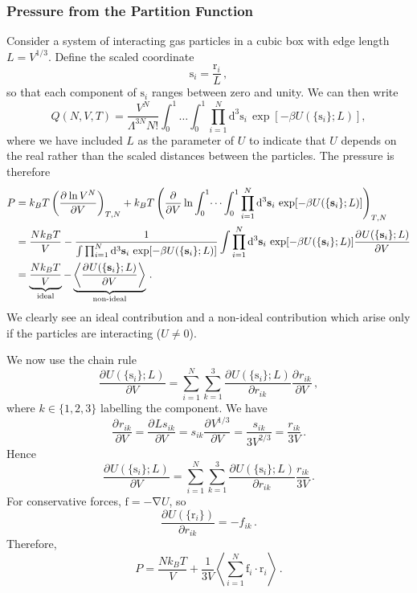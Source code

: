 \documentclass{article}
\theoremstyle{plain}\theoremheaderfont{\normalfont\bfseries}\theorembodyfont{\rmfamily}\theoremseparator{.}\newtheorem*{thm}{Theorem}\newtheorem*{law}{Law}\newtheorem*{pos}{Postulate}
\numberwithin{equation}{section}
\newcommand{\dd}[2][]{\mathrm{d}^{#1} #2\,}
\newcommand{\pdv}[3][]{\frac{\partial^{#1} #2}{{\partial #3}^{#1}}}
\newcommand{\eval}[1]{\left\langle #1 \right\rangle}
\newcommand{\vb}[1]{\bm{\mathrm{#1}}}
\newcommand{\vdot}{\,\bm{\mathrm{\cdot}}\,}
\newcommand{\grad}{\vb{\nabla}}
\begin{document}
    \subsubsection{Pressure from the Partition Function}
    Consider a system of interacting gas particles in a cubic box with edge length \(L=V^{1/3}\). Define the scaled coordinate
    \begin{equation}
        \vb{s}_i=\frac{\vb{r}_i}{L}\,,
    \end{equation}
    so that each component of \(\vb{s}_i\) ranges between zero and unity. We can then write
    \begin{equation}
        Q(N,V,T)=\frac{V^N}{\Lambda^{3N}N!}\int_{0}^{1}\dots\int_{0}^{1}\prod_{i=1}^{N}\dd[3]{\vb{s}_i}\exp[-\beta U(\{\vb{s}_i\};L)],
    \end{equation}
    where we have included \(L\) as the parameter of \(U\) to indicate that \(U\) depends on the real rather than the scaled distances between the particles. The pressure is therefore
    \begin{align}
        P&=k_BT\left(\pdv{\ln V^N}{V}\right)_{T,N}+k_B T\left(\pdv{}{V}\ln\int_{0}^{1}\dots\int_{0}^{1}\prod_{i=1}^{N}\dd[3]{\vb{s}_i}\exp[-\beta U(\{\vb{s}_i\};L)]\right)_{T,N}\notag\\
        &=\frac{Nk_B T}{V}-\frac{1}{\int\prod_{i=1}^{N}\dd[3]{\vb{s}_i}\exp[-\beta U(\{\vb{s}_i\};L)]}\int\prod_{i=1}^{N}\dd[3]{\vb{s}_i}\exp[-\beta U(\{\vb{s}_i\};L)]\pdv{U(\{\vb{s}_i\};L)}{V}\notag\\
        &=\underbrace{\frac{Nk_B T}{V}}_{\text{ideal}}-\underbrace{\eval{\pdv{U(\{\vb{s}_i\};L)}{V}}}_{\text{non-ideal}}\,.
    \end{align}
    We clearly see an ideal contribution and a non-ideal contribution which arise only if the particles are interacting (\(U\ne 0\)).

    We now use the chain rule
    \begin{equation}
        \pdv{U(\{\vb{s}_i\};L)}{V}=\sum_{i=1}^{N}\sum_{k=1}^{3}\pdv{U(\{\vb{s}_i\};L)}{r_{ik}}\pdv{r_{ik}}{V}\,,
    \end{equation}
    where \(k\in\{1,2,3\}\) labelling the component. We have
    \begin{equation}
        \pdv{r_{ik}}{V}=\pdv{Ls_{ik}}{V}=s_{ik}\pdv{V^{1/3}}{V}=\frac{s_{ik}}{3V^{2/3}}=\frac{r_{ik}}{3V}\,.
    \end{equation}
    Hence
    \begin{equation}
        \pdv{U(\{\vb{s}_i\};L)}{V}=\sum_{i=1}^{N}\sum_{k=1}^{3}\pdv{U(\{\vb{s}_i\};L)}{r_{ik}}\frac{r_{ik}}{3V}\,.
    \end{equation}
    For conservative forces, \(\vb{f}=-\grad U\), so
    \begin{equation}
        \pdv{U(\{\vb{r}_i\})}{r_{ik}}=-f_{ik}\,.
    \end{equation}
    Therefore,
    \begin{equation}
        P=\frac{Nk_BT}{V}+\frac{1}{3V}\eval{\sum_{i=1}^{N}\vb{f}_i\vdot\vb{r}_i}\,.
    \end{equation}
\end{document}
